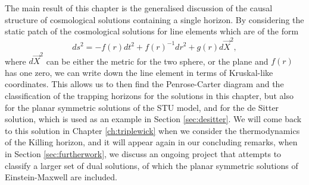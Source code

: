 The main result of this chapter is the generalised discussion of the causal structure of cosmological solutions containing a single horizon. By considering the static patch of the cosmological solutions for line elements which are of the form
\begin{equation*}
	ds^2 = - f(r) dt^2 + f(r)^{-1} dr^2 + g(r) d\vec{X}^2,
\end{equation*}
where $d\vec{X}^2$ can be either the metric for the two sphere, or the plane and $f(r)$ has one zero, we can write down the line element in terms of Kruskal-like coordinates. This allows us to then find the Penrose-Carter diagram and the classification of the trapping horizons for the solutions in this chapter, but also for the planar symmetric solutions of the STU model, and for the de Sitter solution, which is used as an example in Section \ref{sec:desitter}. We will come back to this solution in Chapter \ref{ch:triplewick} when we consider the thermodynamics of the Killing horizon, and it will appear again in our concluding remarks, when in Section \ref{sec:furtherwork}, we discuss an ongoing project that attempts to classify a larger set of dual solutions, of which the planar symmetric solutions of Einstein-Maxwell are included.
